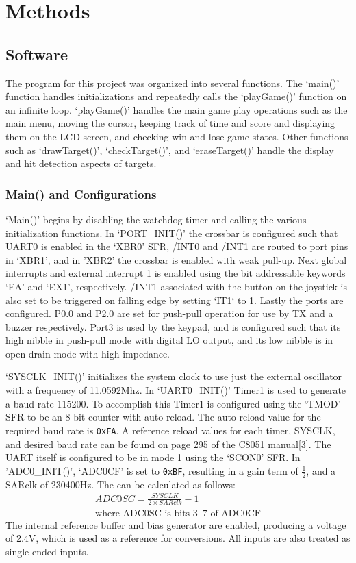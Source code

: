 \documentclass[12pt]{article}
\begin{document}
	\section{Methods}
	\subsection{Software}
	The program for this project was organized into several functions. The `main()' function handles initializations and repeatedly calls the `playGame()' function on an infinite loop. `playGame()' handles the main game play operations such as the main menu, moving the cursor, keeping track of time and score and displaying them on the LCD screen, and checking win and lose game states. Other functions such as `drawTarget()', `checkTarget()', and `eraseTarget()' handle the display and hit detection aspects of targets. 
	
	\subsubsection{Main() and Configurations}
	`Main()' begins by disabling the watchdog timer and calling the various initialization functions. In `PORT\_INIT()' the crossbar is configured such that UART0 is enabled in the `XBR0' SFR, /INT0 and /INT1 are routed to port pins in `XBR1', and in 'XBR2' the crossbar is enabled with weak pull-up. Next global interrupts and external interrupt 1 is enabled using the bit addressable keywords `EA' and `EX1', respectively. /INT1 associated with the button on the joystick is also set to be triggered on falling edge by setting `IT1` to 1. Lastly the ports are configured. P0.0 and P2.0 are set for push-pull operation for use by TX and a buzzer respectively. Port3 is used by the keypad, and is configured such that its high nibble in push-pull mode with digital LO output, and its low nibble is in open-drain mode with high impedance. 
	
	`SYSCLK\_INIT()' initializes the system clock to use just the external oscillator with a frequency of 11.0592\si{Mhz}. In `UART0\_INIT()' Timer1 is used to generate a baud rate 115200. To accomplish this Timer1 is configured using the `TMOD' SFR to be an 8-bit counter with auto-reload. The auto-reload value for the required baud rate is \texttt{0xFA}. A reference reload values for each timer, SYSCLK, and desired baud rate can be found on page 295 of the C8051 manual[3]. The UART itself is configured to be in mode 1 using the `SCON0' SFR. In 'ADC0\_INIT()', `ADC0CF' is set to \texttt{0xBF}, resulting in a gain term of $\frac{1}{2}$, and a SARclk of 230400\si{Hz}. The can be calculated as follows: 
	\begin{gather*}
		ADC0SC=\frac{SYSCLK}{2\times SARclk}-1\\
		\textrm{where ADC0SC is bits 3--7 of ADC0CF}
	\end{gather*}
	The internal reference buffer and bias generator are enabled, producing a voltage of 2.4\si{V}, which is used as a reference for conversions. All inputs are also treated as single-ended inputs.
	
\end{document}
